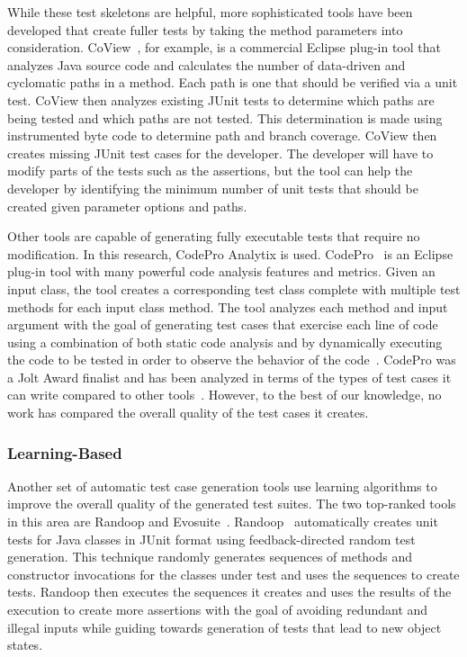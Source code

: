 While these test skeletons are helpful, more sophisticated tools have been developed that create fuller tests by taking the method parameters into consideration. CoView~\cite{CoView}, for example, is a commercial Eclipse plug-in tool that analyzes Java source code and calculates the number of data-driven and cyclomatic paths in a method. Each path is one that should be verified via a unit test. CoView then analyzes existing JUnit tests to determine which paths are being tested and which paths are not tested. This determination is made using instrumented byte code to determine path and branch coverage. CoView then creates missing JUnit test cases for the developer. The developer will have to modify parts of the tests such as the assertions, but the tool can help the developer by identifying the minimum number of unit tests that should be created given parameter options and paths.

Other tools are capable of generating fully executable tests that require no modification.  In this research, CodePro Analytix is used.  CodePro~\cite{CodePro1} is an Eclipse plug-in tool with many powerful code analysis features and metrics.  Given an input class, the tool creates a corresponding test class complete with multiple test methods for each input class method. The tool analyzes each method and input argument with the goal of generating test cases that exercise each line of code using a combination of both static code analysis and by dynamically executing the code to be tested in order to observe the behavior of the code~\cite{CodePro2}.  CodePro was a Jolt Award finalist and has been analyzed in terms of the types of test cases it can write compared to other tools~\cite{xie2009}.  However, to the best of our knowledge, no work has compared the overall quality of the test cases it creates.

\subsubsection{Learning-Based}
Another set of automatic test case generation tools use learning algorithms to improve the overall quality of the generated test suites.  The two top-ranked tools in this area are Randoop and Evosuite~\cite{fraser2013a}.  Randoop~\cite{pacheco2007feedback} automatically creates unit tests for Java classes in JUnit format using feedback-directed random test generation. This technique randomly generates sequences of methods and constructor invocations for the classes under test and uses the sequences to create tests. Randoop then executes the sequences it creates and uses the results of the execution to create more assertions with the goal of avoiding redundant and illegal inputs while guiding towards generation of tests that lead to new object states. 


